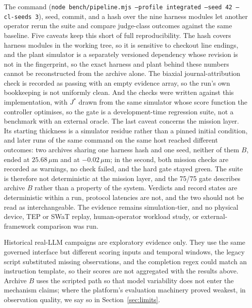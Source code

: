 The command
(\texttt{node bench/pipeline.mjs --profile integrated --seed 42 --cl-seeds 3}),
seed, commit, and a hash over the nine harness modules let another operator rerun
the suite and compare judge-class outcomes against the same baseline. Five caveats keep this short of full reproducibility. The hash covers harness modules in the working tree, so it is sensitive to checkout line endings, and the plant simulator
is a separately versioned dependency whose revision is not in the fingerprint, so
the exact harness and plant behind these numbers cannot be reconstructed from the
archive alone. The biaxial journal-attribution check is recorded as passing with an
empty evidence array, so the run's own bookkeeping is not uniformly clean. And the
checks were written against this implementation, with $J^{*}$ drawn from the same
simulator whose score function the controller optimises, so the gate is a
development-time regression suite, not a benchmark with an external oracle. The last caveat concerns the mission layer. Its starting thickness is a simulator residue rather than a pinned initial condition, and later runs of the same command on the same host reached different outcomes: two archives sharing one harness hash and one seed, neither of them $B$, ended at $25.68\,\mu$m and at $-0.02\,\mu$m; in the second, both mission checks are recorded as warnings, no check failed, and the hard gate stayed green. The suite is therefore not deterministic at the mission layer, and the 75/75 gate describes archive $B$ rather than a property of the system. Verdicts and record states are deterministic within a run, protocol latencies are not, and the two should not be read as interchangeable. The evidence remains simulation-tier, and no
physical device, TEP or SWaT replay, human-operator workload study, or
external-framework comparison was run.

Historical real-LLM campaigns are exploratory evidence only. They use the same
governed interface but different scoring inputs and temporal windows, the legacy
script substituted missing observations, and the completion regex could match an
instruction template, so their scores are not aggregated with the results above.
Archive $B$ uses the scripted path so that model variability does not enter the
mechanism claims; where the platform's evaluation machinery proved weakest, in
observation quality, we say so in Section~\ref{sec:limits}.
